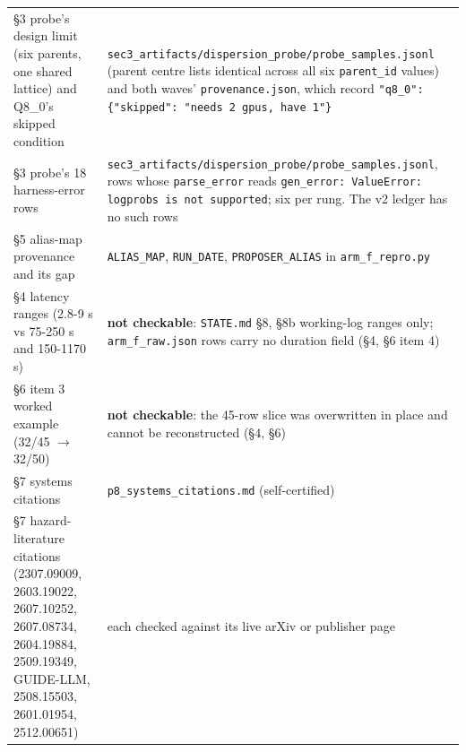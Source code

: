\begin{longtable}{@{}p{}p{}@{}}
\S3 probe's design limit (six parents, one shared lattice) and Q8\_0's skipped condition &
\texttt{sec3\_\bk{}artifacts/\bk{}dispersion\_\bk{}probe/\bk{}probe\_\bk{}samples.jsonl} (parent centre lists identical across all six \texttt{parent\_id} values) and both waves' \texttt{provenance.json}, which record \texttt{"q8\_0": \{"skipped": "needs 2 gpus, have 1"\}} \\

\S3 probe's 18 harness-error rows &
\texttt{sec3\_\bk{}artifacts/\bk{}dispersion\_\bk{}probe/\bk{}probe\_\bk{}samples.jsonl}, rows whose \texttt{parse\_error} reads \texttt{gen\_error: ValueError: logprobs is not supported}; six per rung. The v2 ledger has no such rows \\

\S5 alias-map provenance and its gap &
\texttt{ALIAS\_MAP}, \texttt{RUN\_DATE}, \texttt{PROPOSER\_ALIAS} in \texttt{arm\_f\_repro.py} \\

\S4 latency ranges (2.8-9 s vs 75-250 s and 150-1170 s) &
\textbf{not checkable}: \texttt{STATE.md} \S8, \S8b working-log ranges only; \texttt{arm\_f\_raw.json} rows carry no duration field (\S4, \S6 item 4) \\

\S6 item 3 worked example (32/45 $\rightarrow$ 32/50) &
\textbf{not checkable}: the 45-row slice was overwritten in place and cannot be reconstructed (\S4, \S6) \\

\S7 systems citations &
\texttt{p8\_systems\_citations.md} (self-certified) \\

\S7 hazard-literature citations (2307.09009, 2603.19022, 2607.10252, 2607.08734, 2604.19884, 2509.19349, GUIDE-LLM, 2508.15503, 2601.01954, 2512.00651) &
each checked against its live arXiv or publisher page \\

\end{longtable}
\endgroup
